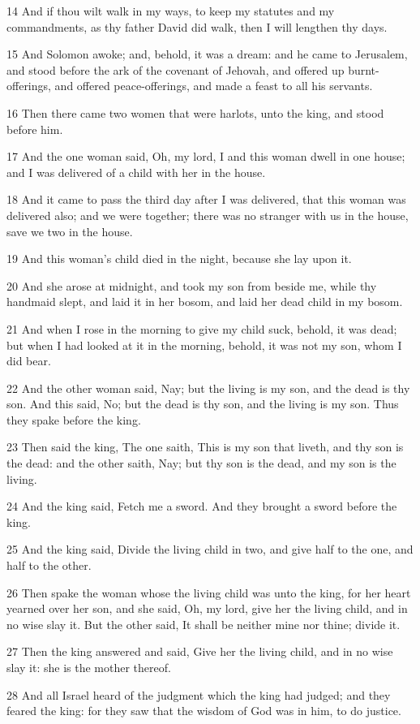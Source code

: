 \par 14 And if thou wilt walk in my ways, to keep my statutes and my commandments, as thy father David did walk, then I will lengthen thy days.
\par 15 And Solomon awoke; and, behold, it was a dream: and he came to Jerusalem, and stood before the ark of the covenant of Jehovah, and offered up burnt-offerings, and offered peace-offerings, and made a feast to all his servants.
\par 16 Then there came two women that were harlots, unto the king, and stood before him.
\par 17 And the one woman said, Oh, my lord, I and this woman dwell in one house; and I was delivered of a child with her in the house.
\par 18 And it came to pass the third day after I was delivered, that this woman was delivered also; and we were together; there was no stranger with us in the house, save we two in the house.
\par 19 And this woman's child died in the night, because she lay upon it.
\par 20 And she arose at midnight, and took my son from beside me, while thy handmaid slept, and laid it in her bosom, and laid her dead child in my bosom.
\par 21 And when I rose in the morning to give my child suck, behold, it was dead; but when I had looked at it in the morning, behold, it was not my son, whom I did bear.
\par 22 And the other woman said, Nay; but the living is my son, and the dead is thy son. And this said, No; but the dead is thy son, and the living is my son. Thus they spake before the king.
\par 23 Then said the king, The one saith, This is my son that liveth, and thy son is the dead: and the other saith, Nay; but thy son is the dead, and my son is the living.
\par 24 And the king said, Fetch me a sword. And they brought a sword before the king.
\par 25 And the king said, Divide the living child in two, and give half to the one, and half to the other.
\par 26 Then spake the woman whose the living child was unto the king, for her heart yearned over her son, and she said, Oh, my lord, give her the living child, and in no wise slay it. But the other said, It shall be neither mine nor thine; divide it.
\par 27 Then the king answered and said, Give her the living child, and in no wise slay it: she is the mother thereof.
\par 28 And all Israel heard of the judgment which the king had judged; and they feared the king: for they saw that the wisdom of God was in him, to do justice.

